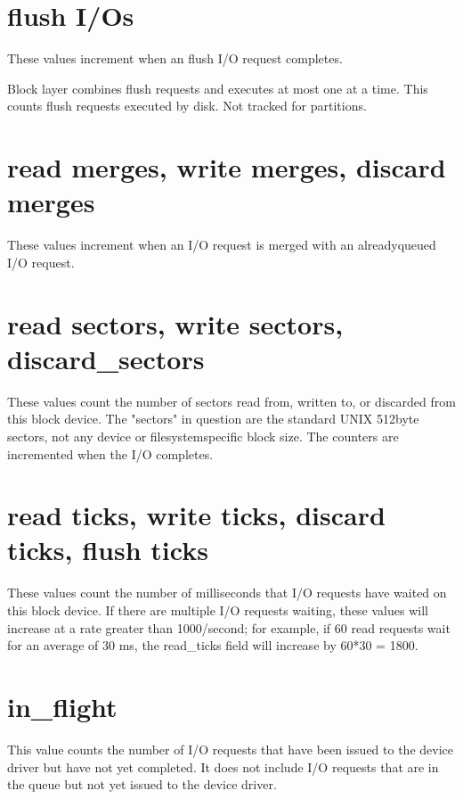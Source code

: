 \documentclass[a4paper,11pt,english]{sphinxmanual}
\begin{document}
\section{flush I/Os}
\label{\detokenize{stat:flush-i-os}}
These values increment when an flush I/O request completes.

Block layer combines flush requests and executes at most one at a time.
This counts flush requests executed by disk. Not tracked for partitions.


\section{read merges, write merges, discard merges}
\label{\detokenize{stat:read-merges-write-merges-discard-merges}}
These values increment when an I/O request is merged with an
already\sphinxhyphen{}queued I/O request.


\section{read sectors, write sectors, discard\_sectors}
\label{\detokenize{stat:read-sectors-write-sectors-discard-sectors}}
These values count the number of sectors read from, written to, or
discarded from this block device.  The "sectors" in question are the
standard UNIX 512\sphinxhyphen{}byte sectors, not any device\sphinxhyphen{} or filesystem\sphinxhyphen{}specific
block size.  The counters are incremented when the I/O completes.


\section{read ticks, write ticks, discard ticks, flush ticks}
\label{\detokenize{stat:read-ticks-write-ticks-discard-ticks-flush-ticks}}
These values count the number of milliseconds that I/O requests have
waited on this block device.  If there are multiple I/O requests waiting,
these values will increase at a rate greater than 1000/second; for
example, if 60 read requests wait for an average of 30 ms, the read\_ticks
field will increase by 60*30 = 1800.


\section{in\_flight}
\label{\detokenize{stat:in-flight}}
This value counts the number of I/O requests that have been issued to
the device driver but have not yet completed.  It does not include I/O
requests that are in the queue but not yet issued to the device driver.
\end{document}
